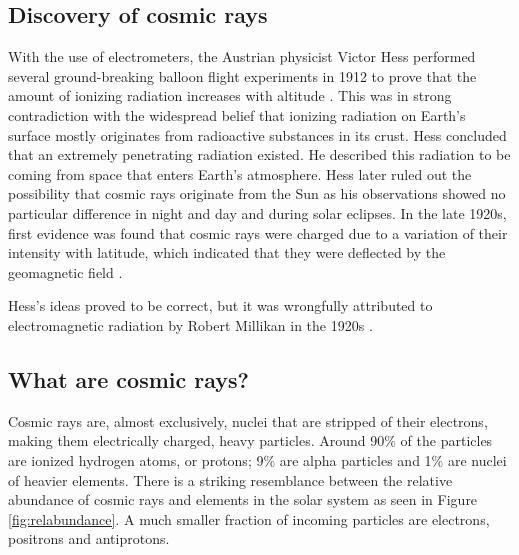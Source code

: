 \subsection{Discovery of cosmic rays}
With the use of electrometers, the Austrian physicist Victor Hess performed several ground-breaking balloon flight experiments in 1912 to prove that the amount of ionizing radiation increases with altitude \cite{hessnobel:1936}. This was in strong contradiction with the widespread belief that ionizing radiation on Earth's surface mostly originates from radioactive substances in its crust. Hess concluded that an extremely penetrating radiation existed. He described this radiation to be coming from space that enters Earth's atmosphere.
Hess later ruled out the possibility that cosmic rays originate from the Sun as his observations showed no particular difference in night and day and during solar eclipses. In the late 1920s, first evidence was found that cosmic rays were charged due to a variation of their intensity with latitude, which indicated that they were deflected by the geomagnetic field \cite{clay:1927a}.

Hess's ideas proved to be correct, but it was wrongfully attributed to electromagnetic radiation by Robert Millikan in the 1920s \cite{PhysRev.32.533}. 

\subsection{What are cosmic rays?}
\label{subsec:whatarecosmicrays}
Cosmic rays are, almost exclusively, nuclei that are stripped of their electrons, making them electrically charged, heavy particles. Around 90\% of the particles are ionized hydrogen atoms, or protons; 9\% are alpha particles and 1\% are nuclei of heavier elements. There is a striking resemblance between the relative abundance of cosmic rays and elements in the solar system as seen in Figure \ref{fig:relabundance}. A much smaller fraction of incoming particles are electrons, positrons and antiprotons.

